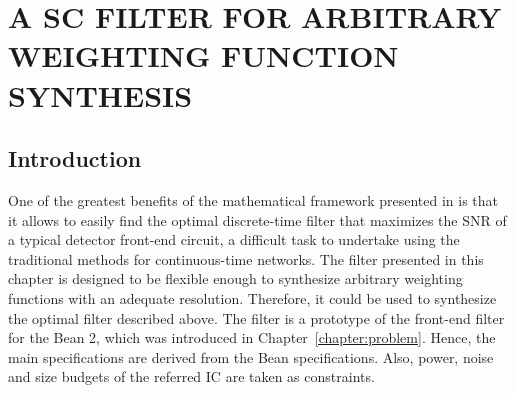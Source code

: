 \chapter{A SC FILTER FOR ARBITRARY WEIGHTING FUNCTION SYNTHESIS}
\label{chapter:introduction}
\section{Introduction}



One of the greatest benefits of the mathematical framework presented in \citep{avila101} is that it allows to easily find the optimal discrete-time filter that maximizes the SNR of a typical detector front-end circuit, a difficult task to undertake using the traditional methods for continuous-time networks. The filter presented in this chapter is designed to be flexible enough to synthesize arbitrary weighting functions with an adequate resolution. Therefore, it could be used to synthesize the optimal filter described above. The filter is a prototype of the front-end filter for the Bean 2, which was introduced in Chapter~\ref{chapter:problem}. Hence, the main specifications are derived from the Bean specifications. Also, power, noise and size budgets of the referred IC are taken as constraints.

